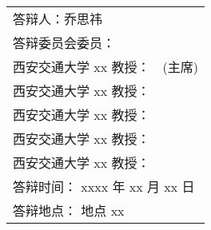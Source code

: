 \begin{titlepage}
\begin{center}
		\vspace{6cm}
		{\sanhao
			\begin{center} \renewcommand{\arraystretch}{1.5}
				\begin{tabular}{ll}
					\multicolumn{2}{l}{答辩人：乔思祎}\\
					\multicolumn{2}{l}{答辩委员会委员：}\\
					\multicolumn{1}{r}{西安交通大学 xx 教授：} & \underline{\hspace{8em}} (主席) \\
					\multicolumn{1}{r}{西安交通大学 xx 教授：} & \underline{\hspace{8em}} \\ 
					\multicolumn{1}{r}{\hspace{2em}西安交通大学 xx 教授：} & \underline{\hspace{8em}} \\
					\multicolumn{1}{r}{西安交通大学 xx 教授：} & \underline{\hspace{8em}} \\
					\multicolumn{1}{r}{西安交通大学 xx 教授：} & \underline{\hspace{8em}} \\
					\multicolumn{2}{l}{答辩时间： xxxx 年 xx 月 xx 日}\\
					\multicolumn{2}{l}{答辩地点： 地点 xx}\\
				\end{tabular} \renewcommand{\arraystretch}{1}
			\end{center} 
		}
	\end{center}
	\clearpage{\pagestyle{empty}\cleardoublepage}
\end{titlepage}